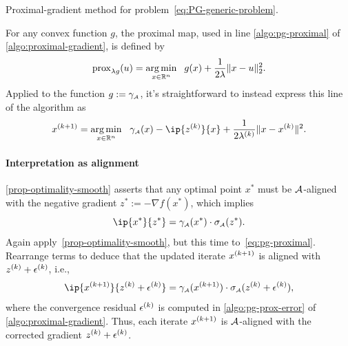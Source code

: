 \begin{algorithm}[t]
  \DontPrintSemicolon\setcounter{AlgoLine}{-1}
  \caption{Proximal-gradient method for problem~\eqref{eq:PG-generic-problem}.
  \label{algo:proximal-gradient}}
\end{algorithm}

For any convex function $g$, the proximal map, used in
line \ref{algo:pg-proximal} of \autoref{algo:proximal-gradient}, is defined by
\begin{equation*}
   \operatorname{prox}_{\lambda g}(u) = \underset{x\in\mathbb{R}^n}{\textrm{arg}\,{\min}}\enskip\; g(x) + \frac{1}{2\lambda}\|x-u\|_2^2.
\end{equation*}
Applied to the function $g:=\gamma_{\scriptscriptstyle\mathcal{A}}$, it's straightforward to instead express
this line of the algorithm as
\begin{equation} \label{eq:pg-proximal}
  x\kp1 = \argmin{x \in \Re^n}
  \ \gauge\As(x) - \ip{z\k}{x} + \frac{1}{2\lambda\k}\|x - x\k\|^2.
\end{equation}
 \paragraph{Interpretation as alignment} \autoref{prop-optimality-smooth} asserts
 that any optimal point $x^*$ must be
 $\mathcal{A}$-aligned with the negative gradient $z^*:=-\nabla f(x^*)$, which implies
\[
  \ip{x^*}{z^*} = \gauge\As(x^*)\cdot\sigma\As(z^*).
\]
Again apply~\autoref{prop-optimality-smooth}, but this time
to~\eqref{eq:pg-proximal}. Rearrange terms to deduce that the updated iterate
$x^{(k+1)}$ is aligned with $z^{(k)}+\epsilon^{(k)}$, i.e.,
\begin{equation} \label{eq:prox-alignment}
  \ip{x\kp1}{z\k + \epsilon\k} = \gauge\As(x\kp1)\cdot\sigma\As(z\k+\epsilon\k),
\end{equation}
where the convergence residual $\epsilon^{(k)}$ is computed in
\autoref{algo:pg-prox-error} of \autoref{algo:proximal-gradient}. Thus, each iterate
$x^{(k+1)}$ is $\mathcal{A}$-aligned with the corrected gradient $z^{(k)}+\epsilon^{(k)}$.

